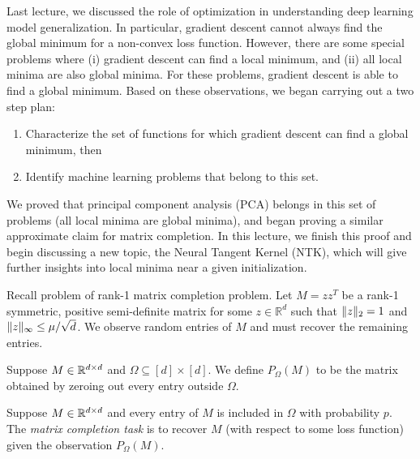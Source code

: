 
\setcounter{section}{0}



Last lecture, we discussed the role of optimization in understanding deep learning model generalization. In particular, gradient descent cannot always find the global minimum for a non-convex loss function. However, there are some special problems where (i) gradient descent can find a local minimum, and (ii) all local minima are also global minima. For these problems, gradient descent is able to find a global minimum. Based on these observations, we began carrying out a two step plan:
\begin{enumerate}
\item Characterize the set of functions for which gradient descent can find a global minimum, then
\item Identify machine learning problems that belong to this set.
\end{enumerate}

We proved that principal component analysis (PCA) belongs in this set of problems (all local minima are global minima), and began proving a similar approximate claim for matrix completion. In this lecture, we finish this proof and begin discussing a new topic, the Neural Tangent Kernel (NTK), which will give further insights into local minima near a given initialization.

Recall problem of rank-1 matrix completion problem. Let $M = zz^T$ be a rank-1 symmetric, positive semi-definite matrix for some $z \in \mathbb{R}^d$ such that $\|z\|_2 = 1$ and $\|z\|_\infty \leq \mu / \sqrt{d}$. We observe random entries of $M$ and must recover the remaining entries.

\begin{definition}
Suppose $M\in \mathbb R^{d\times d}$ and $\Omega \subseteq [d] \times [d]$. We define $P_{\Omega}(M)$ to be the matrix obtained by zeroing out every entry outside $\Omega$. 
\end{definition}

\begin{definition}
Suppose $M\in \mathbb R^{d\times d}$ and every entry of $M$ is included in $\Omega$ with probability $p$. The \textit{matrix completion task} is to recover $M$ (with respect to some loss function) given the observation $P_{\Omega}(M)$.
\end{definition}


